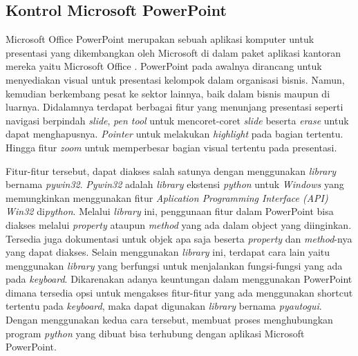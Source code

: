 \subsection{Kontrol Microsoft PowerPoint}
Microsoft Office PowerPoint merupakan sebuah aplikasi komputer untuk presentasi yang dikembangkan oleh Microsoft di dalam paket aplikasi kantoran mereka yaitu Microsoft Office \parencite{Poerwanti2018}. PowerPoint pada awalnya dirancang untuk menyediakan visual untuk presentasi kelompok dalam organisasi bisnis. Namun, kemudian berkembang pesat ke sektor lainnya, baik dalam bisnis maupun di luarnya. Didalamnya terdapat berbagai fitur yang menunjang presentasi seperti navigasi berpindah \emph{slide}, \emph{pen tool} untuk mencoret-coret \emph{slide} beserta \emph{erase} untuk dapat menghapusnya. \emph{Pointer} untuk melakukan \emph{highlight} pada bagian tertentu. Hingga fitur \emph{zoom} untuk memperbesar bagian visual tertentu pada presentasi.

Fitur-fitur tersebut, dapat diakses salah satunya dengan menggunakan \emph{library} bernama \emph{pywin32}. \emph{Pywin32} adalah \emph{library} ekstensi \emph{python} untuk \emph{Windows} yang memungkinkan menggunakan fitur \emph{Aplication Programming Interface (API) Win32} di\emph{python}. Melalui \emph{library} ini, penggunaan fitur dalam PowerPoint bisa diakses melalui \emph{property} ataupun \emph{method} yang ada dalam object yang diinginkan. Tersedia juga dokumentasi untuk objek apa saja beserta \emph{property} dan \emph{method}-nya yang dapat diakses. Selain menggunakan \emph{library} ini, terdapat cara lain yaitu menggunakan \emph{library} yang berfungsi untuk menjalankan fungsi-fungsi yang ada pada \emph{keyboard}. Dikarenakan adanya keuntungan dalam menggunakan PowerPoint dimana tersedia opsi untuk mengakses fitur-fitur yang ada menggunakan shortcut tertentu pada \emph{keyboard}, maka dapat digunakan \emph{library} bernama \emph{pyautogui}. Dengan menggunakan kedua cara tersebut, membuat proses menghubungkan program \emph{python} yang dibuat bisa terhubung dengan aplikasi Microsoft PowerPoint.  


